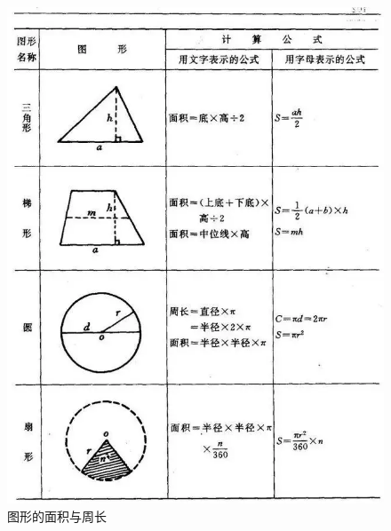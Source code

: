 \documentclass{article}
\theoremstyle{definition}
\theoremstyle{remark}
\theoremstyle{theorem}
\begin{document}
\begin{figure}
    \centering
    \includegraphics[scale=0.5]{area2.png}
    \caption{图形的面积与周长}
    \label{fig:my_label}
\end{figure}
\end{document}
